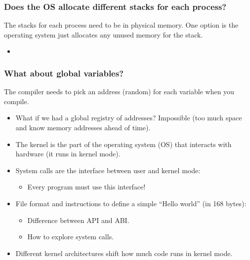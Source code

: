 \subsubsection{Does the OS allocate different stacks for each process?}
\begin{definition}
    The stacks for each process need to be in physical memory. One option is the operating system just allocates any unused memory for the stack. 
    \begin{itemize}
        \item 
    \end{itemize}
\end{definition}

\subsubsection{What about global variables?}
\begin{definition}
    The compiler needs to pick an address (random) for each variable when you compile.
    \begin{itemize}
        \item What if we had a global registry of addresses? Impossible (too much space and know memory addresses ahead of time).
    \end{itemize}
\end{definition}

\begin{summary}
    \begin{itemize}
        \item The kernel is the part of the operating system (OS) that interacts with hardware (it runs in kernel mode).
        \item System calls are the interface between user and kernel mode:
        \begin{itemize}
            \item Every program must use this interface!
        \end{itemize}
        \item File format and instructions to define a simple “Hello world” (in 168 bytes):
        \begin{itemize}
            \item Difference between API and ABI.
            \item How to explore system calls.
        \end{itemize}
        \item Different kernel architectures shift how much code runs in kernel mode.
    \end{itemize}    
\end{summary}

